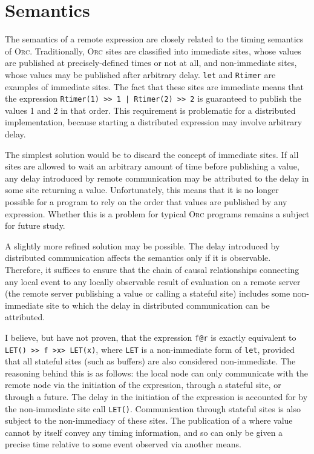 \documentclass[10pt,letterpaper]{article}
\begin{document}
\section{Semantics}

The semantics of a remote expression are closely related to the timing
semantics of \textsc{Orc}. Traditionally, \textsc{Orc} sites are classified
into immediate sites, whose values are published at precisely-defined times or
not at all, and non-immediate sites, whose values may be published after
arbitrary delay. \texttt{let} and \texttt{Rtimer} are examples of immediate
sites. The fact that these sites are immediate means that the expression
\texttt{Rtimer(1) >> 1 | Rtimer(2) >> 2} is guaranteed to publish the values 1
and 2 in that order.  This requirement is problematic for a distributed
implementation, because starting a distributed expression may involve arbitrary
delay.

The simplest solution would be to discard the concept of immediate sites. If
all sites are allowed to wait an arbitrary amount of time before publishing a
value, any delay introduced by remote communication may be attributed to the
delay in some site returning a value.  Unfortunately, this means that it is no
longer possible for a program to rely on the order that values are published by
any expression.  Whether this is a problem for typical \textsc{Orc} programs
remains a subject for future study.

A slightly more refined solution may be possible.  The delay introduced by
distributed communication affects the semantics only if it is observable.
Therefore, it suffices to ensure that the chain of causal relationships
connecting any local event to any locally observable result of evaluation on a
remote server (the remote server publishing a value or calling a stateful site)
includes some non-immediate site to which the delay in distributed
communication can be attributed.

I believe, but have not proven, that the expression \texttt{f@r} is exactly
equivalent to \texttt{LET() >> f >x> LET(x)}, where \texttt{LET} is a
non-immediate form of \texttt{let}, provided that all stateful sites (such as
buffers) are also considered non-immediate.  The reasoning behind this is as
follows: the local node can only communicate with the remote node via the
initiation of the expression, through a stateful site, or through a future. The
delay in the initiation of the expression is accounted for by the non-immediate
site call \texttt{LET()}. Communication through stateful sites is also subject
to the non-immediacy of these sites. The publication of a where value cannot by
itself convey any timing information, and so can only be given a precise time
relative to some event observed via another means.
\end{document}
